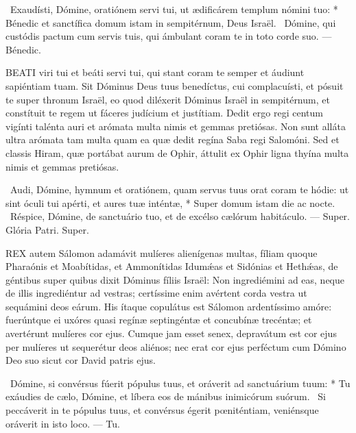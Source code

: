 \R\ Exaudísti, Dómine, oratiónem servi tui, ut ædificárem templum nómini tuo: * Bénedic et sanctífica domum istam in sempitérnum, Deus Israël. \V\ Dómine, qui custódis pactum cum servis tuis, qui ámbulant coram te in toto corde suo. --- Bénedic.



\lettrine[lines=2]{B}{EATI} viri tui et beáti servi tui, qui stant coram te semper et áudiunt sapiéntiam tuam. Sit Dóminus Deus tuus benedíctus, cui complacuísti, et pósuit te super thronum Israël, eo quod diléxerit Dóminus Israël in sempitérnum, et constítuit te regem ut fáceres judícium et justítiam. Dedit ergo regi centum vigínti talénta auri et arómata multa nimis et gemmas pretiósas. Non sunt alláta ultra arómata tam multa quam ea quæ dedit regína Saba regi Salomóni. Sed et classis Hiram, quæ portábat aurum de Ophir, áttulit ex Ophir ligna thyína multa nimis et gemmas pretiósas.

\R\ Audi, Dómine, hymnum et oratiónem, quam servus tuus orat coram te hódie: ut sint óculi tui apérti, et aures tuæ inténtæ, * Super domum istam die ac nocte. \V\ Réspice, Dómine, de sanctuário tuo, et de excélso cælórum habitáculo. --- Super. Glória Patri. Super.




\lettrine[lines=2]{R}{EX} autem Sálomon adamávit mulíeres alienígenas multas, fíliam quoque Pharaónis et Moabítidas, et Ammonítidas Idumǽas et Sidónias et Hethǽas, de géntibus super quibus dixit Dóminus fíliis Israël: Non ingrediémini ad eas, neque de illis ingrediéntur ad vestras; certíssime enim avértent corda vestra ut sequámini deos eárum. His ítaque copulátus est Sálomon ardentíssimo amóre: fuerúntque ei uxóres quasi regínæ septingéntæ et concubínæ trecéntæ; et avertérunt mulíeres cor ejus. Cumque jam esset senex, depravátum est cor ejus per mulíeres ut sequerétur deos aliénos; nec erat cor ejus perféctum cum Dómino Deo suo sicut cor David patris ejus.

\R\ Dómine, si convérsus fúerit pópulus tuus, et oráverit ad sanctuárium tuum: * Tu exáudies de cælo, Dómine, et líbera eos de mánibus inimicórum suórum. \V\ Si peccáverit in te pópulus tuus, et convérsus égerit pœniténtiam, veniénsque oráverit in isto loco. --- Tu.

